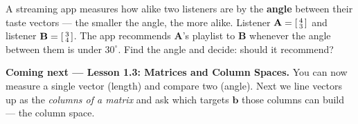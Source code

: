 \documentclass[10pt]{article}
\begin{document}
\begin{extensionbox}
A streaming app measures how alike two listeners are by the \textbf{angle} between their taste
vectors --- the smaller the angle, the more alike. Listener $\mathbf{A}=\begin{bsmallmatrix} 4 \\ 3 \end{bsmallmatrix}$
and listener $\mathbf{B}=\begin{bsmallmatrix} 3 \\ 4 \end{bsmallmatrix}$. The app recommends
$\mathbf{A}$'s playlist to $\mathbf{B}$ whenever the angle between them is under $30^\circ$.
Find the angle and decide: should it recommend? 
\end{extensionbox}

\begin{spiralbox}
\textbf{Coming next --- Lesson 1.3: Matrices and Column Spaces.} You can now measure a single
vector (length) and compare two (angle). Next we line vectors up as the \emph{columns of a
matrix} and ask which targets $\mathbf{b}$ those columns can build --- the column space.
\end{spiralbox}
\end{document}
